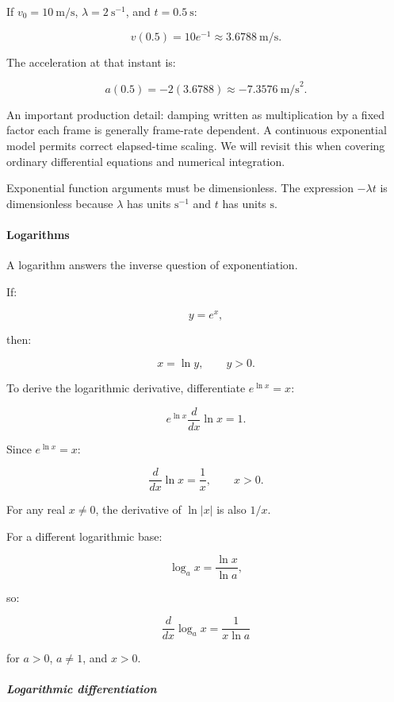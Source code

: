 If \(v_0=10\ \text{m/s}\), \(\lambda=2\ \mathrm{s}^{-1}\), and \(t=0.5\ \text{s}\):

\[
v(0.5)=10e^{-1}\approx3.6788\ \text{m/s}.
\]

The acceleration at that instant is:

\[
a(0.5)=-2(3.6788)\approx-7.3576\ \text{m/s}^2.
\]

An important production detail: damping written as multiplication by a fixed factor each frame is generally frame-rate dependent. A continuous exponential model permits correct elapsed-time scaling. We will revisit this when covering ordinary differential equations and numerical integration.

Exponential function arguments must be dimensionless. The expression \(-\lambda t\) is dimensionless because \(\lambda\) has units \(\mathrm{s}^{-1}\) and \(t\) has units \(\mathrm{s}\).

\paragraph{Logarithms}\label{01-foundations-i-ch020-logarithms}

\hypertarget{01-foundations-i-ch020-logarithms}{}

A logarithm answers the inverse question of exponentiation.

If:

\[
y=e^x,
\]

then:

\[
x=\ln y,\qquad y>0.
\]

To derive the logarithmic derivative, differentiate \(e^{\ln x}=x\):

\[
e^{\ln x}\frac d{dx}\ln x=1.
\]

Since \(e^{\ln x}=x\):

\[
\boxed{\frac d{dx}\ln x=\frac1x},\qquad x>0.
\]

For any real \(x\ne0\), the derivative of \(\ln|x|\) is also \(1/x\).

For a different logarithmic base:

\[
\log_a x=\frac{\ln x}{\ln a},
\]

so:

\[
\boxed{\frac d{dx}\log_a x=\frac1{x\ln a}}
\]

for \(a>0\), \(a\ne1\), and \(x>0\).

\subparagraph{Logarithmic differentiation}\label{01-foundations-i-ch020-logarithmic-differentiation}

\hypertarget{01-foundations-i-ch020-logarithmic-differentiation}{}

